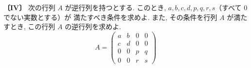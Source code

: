\noindent\textbf{〔IV〕}
次の行列 $A$ が逆行列を持つとする. このとき, $a,b,c,d,p,q,r,s$（すべて $0$ でない実数とする）が
満たすべき条件を求めよ. また, その条件を行列 $A$ が満たすとき, この行列 $A$ の逆行列を求めよ.
\[
A=\begin{pmatrix}
a & b & 0 & 0\\
c & d & 0 & 0\\
0 & 0 & p & q\\
0 & 0 & r & s
\end{pmatrix}
\]
